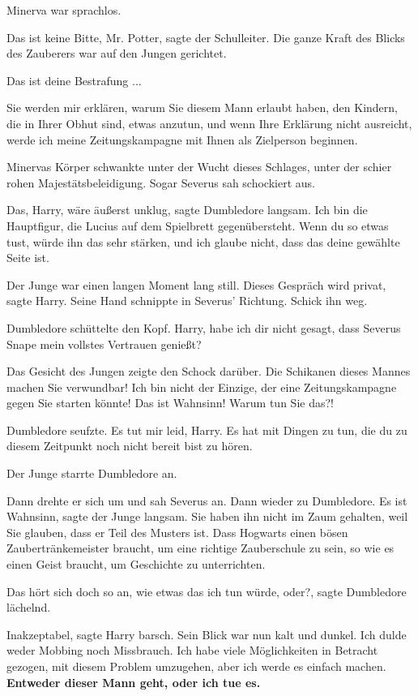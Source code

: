 Minerva war sprachlos.

\glqq{}Das ist keine Bitte, Mr. Potter\grqq{}, sagte der Schulleiter. Die ganze
Kraft des Blicks des Zauberers war auf den Jungen gerichtet.

\glqq{}Das ist deine Bestrafung ...\grqq{}

\glqq{}Sie werden mir erklären, warum Sie diesem Mann erlaubt haben, den Kindern,
die in Ihrer Obhut sind, etwas anzutun, und wenn Ihre Erklärung nicht ausreicht,
werde ich meine Zeitungskampagne mit Ihnen als Zielperson beginnen.\grqq{}

Minervas Körper schwankte unter der Wucht dieses Schlages, unter der schier
rohen Majestätsbeleidigung. Sogar Severus sah schockiert aus.

\glqq{}Das, Harry, wäre äußerst unklug\grqq{}, sagte Dumbledore langsam. \glqq{}
Ich bin die Hauptfigur, die Lucius auf dem Spielbrett gegenübersteht. Wenn du so
etwas tust, würde ihn das sehr stärken, und ich glaube nicht, dass das deine
gewählte Seite ist.\grqq{}

Der Junge war einen langen Moment lang still. \glqq{}Dieses Gespräch wird
privat\grqq{}, sagte Harry. Seine Hand schnippte in Severus' Richtung. \glqq{}
Schick ihn weg.\grqq{}

Dumbledore schüttelte den Kopf. \glqq{}Harry, habe ich dir nicht gesagt, dass
Severus Snape mein vollstes Vertrauen genießt?\grqq{}

Das Gesicht des Jungen zeigte den Schock darüber. \glqq{}Die Schikanen dieses
Mannes machen Sie verwundbar! Ich bin nicht der Einzige, der eine
Zeitungskampagne gegen Sie starten könnte! Das ist Wahnsinn! Warum tun Sie
das?!\grqq{}

Dumbledore seufzte. \glqq{}Es tut mir leid, Harry. Es hat mit Dingen zu tun, die
du zu diesem Zeitpunkt noch nicht bereit bist zu hören.\grqq{}

Der Junge starrte Dumbledore an.

Dann drehte er sich um und sah Severus an. Dann wieder zu Dumbledore. \glqq{}Es
ist Wahnsinn\grqq{}, sagte der Junge langsam. \glqq{}Sie haben ihn nicht im Zaum
gehalten, weil Sie glauben, dass er Teil des Musters ist. Dass Hogwarts einen
bösen Zaubertränkemeister braucht, um eine richtige Zauberschule zu sein, so wie
es einen Geist braucht, um Geschichte zu unterrichten.\grqq{}

\glqq{}Das hört sich doch so an, wie etwas das ich tun würde, oder?\grqq{}, sagte
Dumbledore lächelnd.

\glqq{}Inakzeptabel\grqq{}, sagte Harry barsch. Sein Blick war nun kalt und
dunkel. \glqq{}Ich dulde weder Mobbing noch Missbrauch. Ich habe viele
Möglichkeiten in Betracht gezogen, mit diesem Problem umzugehen, aber ich werde
es einfach machen. \textbf{Entweder dieser Mann geht, oder ich tue es.}\grqq{}

